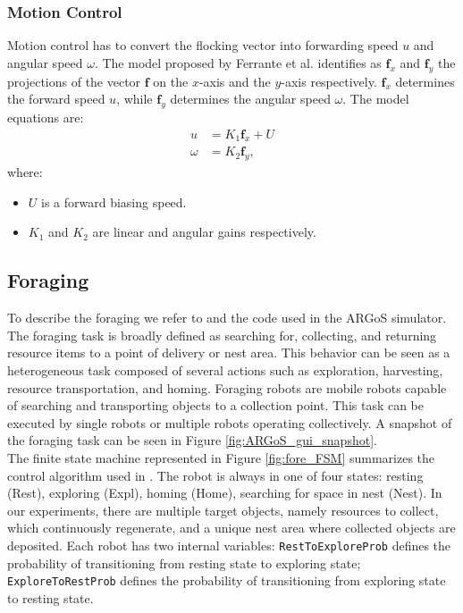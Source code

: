 \documentclass[../../Thesis.tex]{subfiles}
\begin{document}
			\subsubsection{Motion Control}
				Motion control has to convert the flocking vector into forwarding speed $u$ and angular speed $\omega$. The model proposed by Ferrante et al. identifies as $\mathbf{f}_x$ and $\mathbf{f}_y$ the projections of the vector $\mathbf{f}$ on the $x$-axis and the $y$-axis respectively. $\mathbf{f}_x$ determines the forward speed $u$, while $\mathbf{f}_y$ determines the angular speed $\omega$. The model equations are:
				\begin{align*}
					u & = K_1 \mathbf{f}_x + U \\
					\omega & = K_2 \mathbf{f}_y,
				\end{align*}
				where:
				\begin{itemize}
					\item $U$ is a forward biasing speed.
					\item $K_1$ and $K_2$ are linear and angular gains respectively.
				\end{itemize}
		
		\subsection{Foraging}
		\label{sec:Foraging}%
			To describe the foraging we refer to \cite{Winfield2009} and the code used in the ARGoS simulator. The foraging task is broadly defined as searching for, collecting, and returning resource items to a point of delivery or nest area. This behavior can be seen as a heterogeneous task composed of several actions such as exploration, harvesting, resource transportation, and homing. Foraging robots are mobile robots capable of searching and transporting objects to a collection point. This task can be executed by single robots or multiple robots operating collectively. A snapshot of the foraging task can be seen in Figure \ref{fig:ARGoS_gui_snapshot}.\\
			The finite state machine represented in Figure \ref{fig:fore_FSM} summarizes the control algorithm used in \cite{PinciroliCode}. The robot is always in one of four states: resting (Rest), exploring (Expl), homing (Home), searching for space in nest (Nest). In our experiments, there are multiple target objects, namely resources to collect, which continuously regenerate, and a unique nest area where collected objects are deposited. Each robot has two internal variables: \verb|RestToExploreProb| defines the probability of transitioning from resting state to exploring state; \verb|ExploreToRestProb| defines the probability of transitioning from exploring state to resting state.
\end{document}
